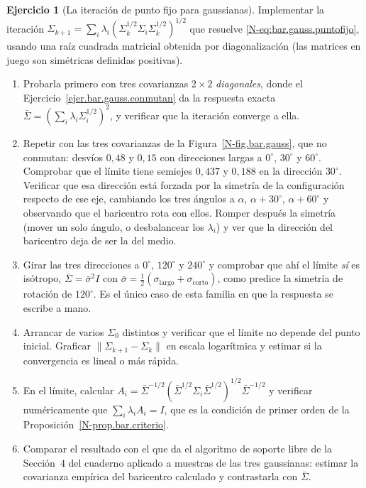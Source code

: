 \documentclass[11pt,a4paper]{amsart}
\newcounter{chapter}
\theoremstyle{remark}
\theoremstyle{definition}
\newtheorem{ejercicio}{Ejercicio}[chapter]
\numberwithin{subsection}{section}
\numberwithin{equation}{section}
\begin{document}
\begin{ejercicio}[La iteración de punto fijo para gaussianas]\label{ejc.bar.gauss.iteracion}
Implementar la iteración
$\Sigma_{k+1}=\sum_i\lambda_i(\Sigma_k^{1/2}\Sigma_i\Sigma_k^{1/2})^{1/2}$ que
resuelve \eqref{N-eq:bar.gauss.puntofijo}, usando una raíz cuadrada matricial
obtenida por diagonalización (las matrices en juego son simétricas definidas
positivas).
\begin{enumerate}[label=(\alph*)]
\item Probarla primero con tres covarianzas $2\times2$ \emph{diagonales}, donde
el Ejercicio~\ref{ejer.bar.gauss.conmutan} da la respuesta exacta
$\bar\Sigma=(\sum_i\lambda_i\Sigma_i^{1/2})^2$, y verificar que la iteración
converge a ella.
\item Repetir con las tres covarianzas de la Figura~\ref{N-fig.bar.gauss}, que
no conmutan: desvíos $0{,}48$ y $0{,}15$ con direcciones largas a $0^\circ$,
$30^\circ$ y $60^\circ$. Comprobar que el límite tiene semiejes $0{,}437$ y
$0{,}188$ en la dirección $30^\circ$. Verificar que esa dirección está forzada
por la simetría de la configuración respecto de ese eje, cambiando los tres
ángulos a $\alpha$, $\alpha+30^\circ$, $\alpha+60^\circ$ y observando que el
baricentro rota con ellos. Romper después la simetría (mover un solo ángulo, o
desbalancear los $\lambda_i$) y ver que la dirección del baricentro deja de
ser la del medio.
\item Girar las tres direcciones a $0^\circ$, $120^\circ$ y $240^\circ$ y
comprobar que ahí el límite \emph{sí} es isótropo, $\bar\Sigma=\bar\sigma^2I$
con $\bar\sigma=\tfrac12(\sigma_{\text{largo}}+\sigma_{\text{corto}})$, como
predice la simetría de rotación de $120^\circ$. Es el único caso de esta
familia en que la respuesta se escribe a mano.
\item Arrancar de varios $\Sigma_0$ distintos y verificar que el límite no
depende del punto inicial. Graficar $\|\Sigma_{k+1}-\Sigma_k\|$ en escala
logarítmica y estimar si la convergencia es lineal o más rápida.
\item En el límite, calcular
$A_i=\bar\Sigma^{-1/2}(\bar\Sigma^{1/2}\Sigma_i\bar\Sigma^{1/2})^{1/2}\bar\Sigma^{-1/2}$
y verificar numéricamente que $\sum_i\lambda_iA_i=I$, que es la condición de
primer orden de la Proposición~\ref{N-prop.bar.criterio}.
\item Comparar el resultado con el que da el algoritmo de soporte libre de la
Sección~4 del cuaderno aplicado a muestras de las tres gaussianas: estimar la
covarianza empírica del baricentro calculado y contrastarla con $\bar\Sigma$.
\end{enumerate}
\end{ejercicio}
\end{document}
